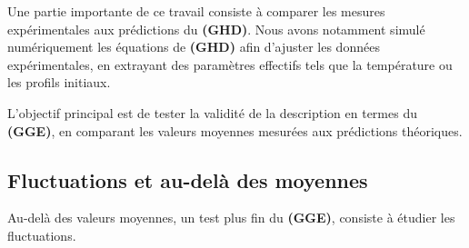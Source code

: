 Une partie importante de ce travail consiste à comparer les mesures
expérimentales aux prédictions du {\bf\textsf{(GHD)}}. Nous avons notamment
simulé numériquement les équations de {\bf\textsf{(GHD)}} afin d’ajuster les
données expérimentales, en extrayant des paramètres effectifs tels que la
température ou les profils initiaux.

L’objectif principal est de tester la validité de la description en termes du
    {\bf\textsf{(GGE)}}, en comparant les valeurs moyennes mesurées aux prédictions
théoriques.


\vspace{-0.5cm}
\subsection{Fluctuations et au-delà des moyennes}

Au-delà des valeurs moyennes, un test plus fin du {\bf\textsf{(GGE)}}, consiste
à étudier les fluctuations.

